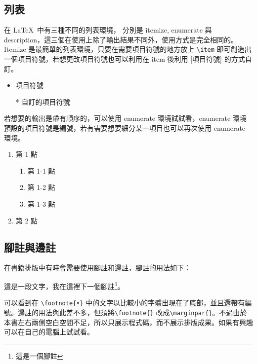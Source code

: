\subsection{列表}

在 \LaTeX\ 中有三種不同的列表環境， 分別是 itemize, enumerate 與 description，這三個在使用上除了輸出結果不同外，使用方式是完全相同的。Itemize 是最簡單的列表環境，只要在需要項目符號的地方放上 \verb|\item| 即可創造出一個項目符號，若想更改項目符號也可以利用在 item 後利用 [項目符號] 的方式自訂。

\begin{tcblisting}{}
\begin{itemize}
\item 項目符號
\item[*] 自訂的項目符號 
\end{itemize}
\end{tcblisting}

若想要的輸出是帶有順序的，可以使用 enumerate 環境試試看，enumerate 環境預設的項目符號是編號，若有需要想要細分某一項目也可以再次使用 enumerate 環境。

\begin{tcblisting}{}
\begin{enumerate}
\item 第 1 點
\begin{enumerate}
\item 第 1-1 點
\item 第 1-2 點
\item 第 1-3 點
\end{enumerate}
\item 第 2 點
\end{enumerate}
\end{tcblisting}

\subsection{腳註與邊註}

在書籍排版中有時會需要使用腳註和邊註，腳註的用法如下：

\begin{tcblisting}{}
這是一段文字，我在這裡下一個腳註\footnote{這是一個腳註}。
\end{tcblisting}

可以看到在 \verb|\footnote{•}| 中的文字以比較小的字體出現在了底部，並且還帶有編號。邊註的用法與此差不多，但須將\verb|\footnote{}| 改成\verb|\marginpar{}|。不過由於本書左右兩側空白空間不足，所以只展示程式碼，而不展示排版成果。如果有興趣可以在自己的電腦上試試看。

